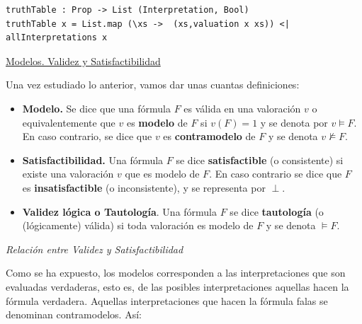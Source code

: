 \documentclass[a4paper]{report}
\begin{document}
\begin{lstlisting}[caption= {Función para la construcción de la tabla de verdad de una fórmula}]
truthTable : Prop -> List (Interpretation, Bool)
truthTable x = List.map (\xs ->  (xs,valuation x xs)) <| allInterpretations x
\end{lstlisting}

\noindent\underline{Modelos. Validez y Satisfactibilidad}

Una vez estudiado lo anterior, vamos dar unas cuantas definiciones:

\begin{itemize}
\item \textbf{Modelo.} Se dice que una fórmula $F$ es válida en una valoración $v$ o equivalentemente que $v$ es \textbf{modelo} de $F$ si $v(F)=1$ y se denota por $v \models F$. En caso contrario, se dice que $v$ es \textbf{contramodelo} de $F$ y se denota $v \not \models F$.

\item \textbf{Satisfactibilidad.} Una fórmula $F$ se dice \textbf{satisfactible} (o consistente) si existe una valoración $v$ que es modelo de $F$. En caso contrario se dice que $F$ es \textbf{insatisfactible} (o inconsistente), y se representa por $\perp$.

\item \textbf{Validez lógica o Tautología}. Una fórmula $F$ se dice \textbf{tautología} (o (lógicamente) válida) si toda valoración es modelo de $F$ y se denota $\models F$.

\end{itemize} 

\noindent \textit{Relación entre Validez y Satisfactibilidad}


Como se ha expuesto, los modelos corresponden a las interpretaciones que son evaluadas verdaderas, esto es, de las posibles interpretaciones aquellas hacen la fórmula verdadera. Aquellas interpretaciones que hacen la fórmula falas se denominan contramodelos. Así:\\
\end{document}
